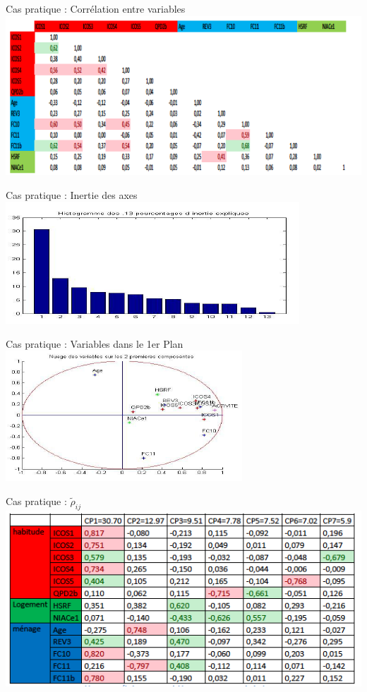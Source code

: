 \documentclass[11pt]{beamer}
\begin{document}
\begin{frame}{ Cas pratique : Corrélation entre variables }
\centering 
\includegraphics[scale=0.5]{CNL2} 

\end{frame}

\begin{frame}{ Cas pratique : Inertie des axes}
\centering 
\includegraphics[scale=0.7]{CNL3} 

\end{frame}


\begin{frame}{ Cas pratique : Variables dans le 1er Plan  }
\centering 
\includegraphics[scale=0.7]{CNL4} 

\end{frame}

\begin{frame}{ Cas pratique :  $\tilde{\rho}_{ij}$}
\centering 
\includegraphics[scale=0.6]{CNL5} 

\end{frame}
\end{document}
